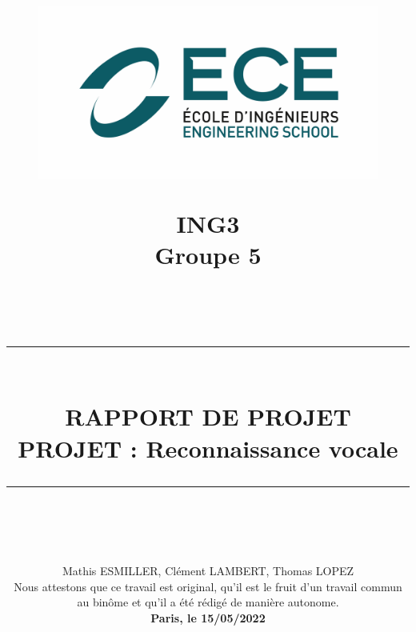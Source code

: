\documentclass[a4paper,11pt]{book}
\newcommand{\HRule}[1]{\rule{\linewidth}{#1}}
\begin{document}
	\begin{titlepage}
	\title{\vspace{-5em}
		\begin{figure}[htb]
			\begin{minipage}[t]{.45\textwidth}
				\centering
				\includegraphics[width=\textwidth]{ece.png}
			\end{minipage}
			\hfill
			\begin{minipage}[t]{.45\textwidth}
				\centering
				\flushright\vspace{-12mm}\Large{\textbf{ING{3}}\\ Groupe {5}}
			\end{minipage}
		\end{figure}
		\normalsize \textsc{} \\ [1.2cm]
		\HRule{1.5pt} \\ [0.5cm]
		\LARGE \textbf{\Large{RAPPORT DE PROJET}\\ \vspace{5mm}
			\Huge{\textcolor{ece}{PROJET : {Reconnaissance vocale}}}}
		\HRule{1.5pt} \\
		\normalsize  \vspace{1cm}
		}
	\date{Mathis ESMILLER, Clément LAMBERT, Thomas LOPEZ\\ Nous attestons que ce travail est original, qu’il est le fruit d’un travail commun au binôme et qu’il a été rédigé de manière autonome. \\ \textbf{{Paris, le 15/05/2022}}}

	\author{}
\end{titlepage}
\end{document}
